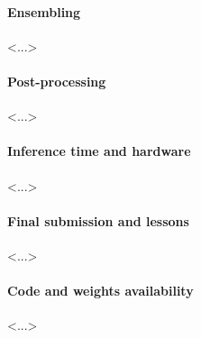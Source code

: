 \paragraph{Ensembling} <...>

\paragraph{Post-processing} <...>

\paragraph{Inference time and hardware} <...>

\paragraph{Final submission and lessons} <...>

\paragraph{Code and weights availability} <...>


